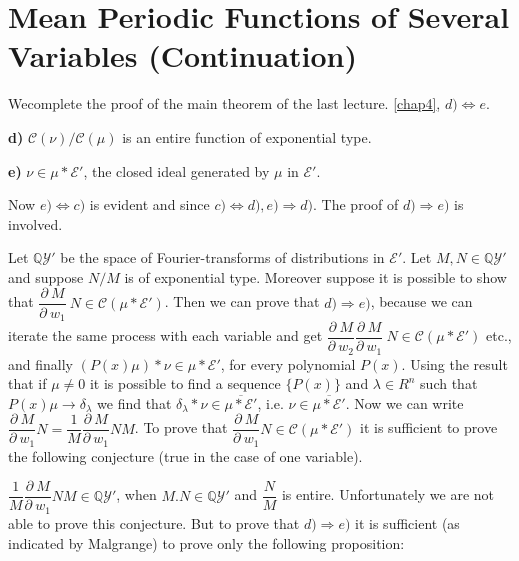 \chapter[Mean Periodic Functions of Several Variables
 (Contd.)]{Mean Periodic Functions of Several Variables
 (Continuation)}\label{chap24}%

We\pageoriginale complete the proof of the main theorem of the last
lecture. \ref{chap4}, $d) \Longleftrightarrow e$. 

\textbf{d)} $\mathscr{C}(\nu)/\mathscr{C}(\mu)$ is an entire function
of exponential type. 

\textbf{e)} $\nu \in \mu * \mathscr{E}'$, the closed ideal generated
by $\mu$ in $\mathscr{E}'$. 

Now $e) \Longleftrightarrow c)$ is evident and since $c)
\Longleftrightarrow d), e) \Rightarrow d)$. The proof of $d)
\Rightarrow e)$ is involved. 

Let $\mathbb{Q}\mathscr{Y}'$ be the space of Fourier-transforms of
distributions in $\mathscr{E}'$. Let $M, N \in \mathbb{Q}\mathscr{Y}'$
and suppose $N/M$ is of exponential type. Moreover suppose it is
possible to show that $\dfrac{\partial ~ M}{\partial ~ w_1} ~ N \in
\mathscr{C} (\mu * \mathscr{E}')$. Then we can prove that $d)
\Rightarrow e)$, because we can iterate the same process with each
variable and get $\dfrac{\partial ~ M }{\partial ~ w_2}
\dfrac{\partial ~ M}{\partial ~ w_1} ~ N \in \mathscr{C} (\mu *
\mathscr{E}')$ etc., and finally $(P(x) \mu) * \nu \in \mu *
\mathscr{E}'$, for every polynomial $P(x)$. Using the result that if
$\mu \neq 0$ it is possible to find a sequence $\{P(x) \}$ and
$\lambda \in R^n$ such that $P(x) \mu \rightarrow \delta_\lambda$ we
find that $\delta_\lambda * \nu \in \overline{\mu * \mathscr{E}'}$,
i.e. $\nu \in \overline{\mu * \mathscr{E}'}$. Now we can write
$\dfrac{\partial ~ M}{\partial ~ w_1} N = \dfrac{1}{M} \dfrac{\partial
 ~ M}{\partial ~ w_1}NM$. To prove that $\dfrac{\partial ~
 M}{\partial ~ w_1} N \in \mathscr{C} (\mu * \mathscr{E}')$ it is
sufficient to prove the following conjecture (true in the case of one
variable). 

\begin{conjecture}%
 $\dfrac{1}{M} \dfrac{\partial ~ M}{\partial ~ w_1} NM \in \mathbb{Q}
 \mathscr{Y}'$, when $M.N \in \mathbb{Q}\mathscr{Y}'$ and
 $\dfrac{N}{M}$ is entire. Unfortunately we are not able to prove
 this conjecture. But to prove that $d) \Rightarrow e)$ it is
 sufficient (as indicated by Malgrange) to prove only the following
 proposition: 
\end{conjecture}


